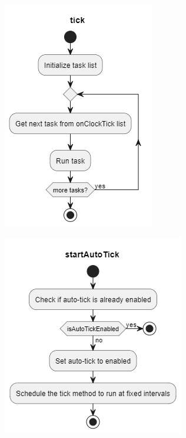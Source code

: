 \documentclass{article}
\begin{document}
\begin{multicols}{2}
    \begin{tcolorbox}[colback=white!5!white,colframe=violet!75!black,title=Execuție tact cu tact]
        \begin{center}
            \includegraphics[width=.75\linewidth]{img/activityClockTick.png}
        \end{center}
    \end{tcolorbox}
    \columnbreak
    \begin{tcolorbox}[colback=white!5!white,colframe=violet!75!black,title=Execuție continuă]
        \begin{center}
            \includegraphics[width=.75\linewidth]{img/activityClockStartAutoTick.png}
        \end{center}
    \end{tcolorbox}
\end{multicols}
\end{document}
